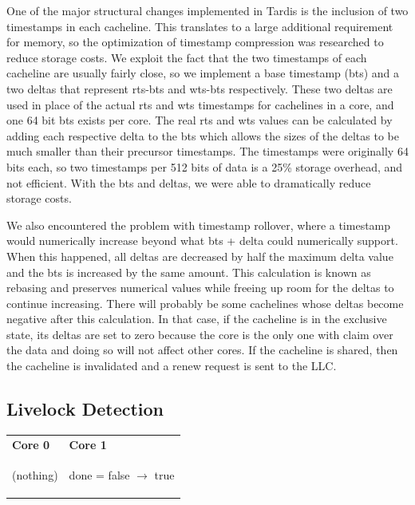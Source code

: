 \documentclass[12pt]{article}
\begin{document}
One of the major structural changes implemented in Tardis is the inclusion of two timestamps in each cacheline. This translates to a large additional requirement for memory, so the optimization of timestamp compression was researched to reduce storage costs. We exploit the fact that the two timestamps of each cacheline are usually fairly close, so we implement a base timestamp (bts) and a two deltas that represent rts-bts and wts-bts respectively. These two deltas are used in place of the actual rts and wts timestamps for cachelines in a core, and one 64 bit bts exists per core. The real rts and wts values can be calculated by adding each respective delta to the bts which allows the sizes of the deltas to be much smaller than their precursor timestamps. The timestamps were originally 64 bits each, so two timestamps per 512 bits of data is a 25\% storage overhead, and not efficient.  With the bts and deltas, we were able to dramatically reduce storage costs. 


We also encountered the problem with timestamp rollover, where a timestamp would numerically increase beyond what bts + delta could numerically support. When this happened, all deltas are decreased by half the maximum delta value and the bts is increased by the same amount. This calculation is known as rebasing and preserves numerical values while freeing up room for the deltas to continue increasing. There will probably be some cachelines whose deltas become negative after this calculation. In that case, if the cacheline is in the exclusive state, its deltas are set to zero because the core is the only one with claim over the data and doing so will not affect other cores. If the cacheline is shared, then the cacheline is invalidated and a renew request is sent to the LLC. 



\subsection{Livelock Detection} \label{sec:livelock-detection}

\begin{center}
	
	\begin{tabular}{p{5cm} p{5cm}}
		\textbf{Core 0} & \textbf{Core 1} \\
		\begin{algorithm}[H]
			\While{!done}
			{(nothing)}
			
		\end{algorithm}
		&
		\begin{algorithm}[H]
			done = false $\rightarrow$  true
		\end{algorithm}
		\\
	\end{tabular}
	
\end{center}
\end{document}
